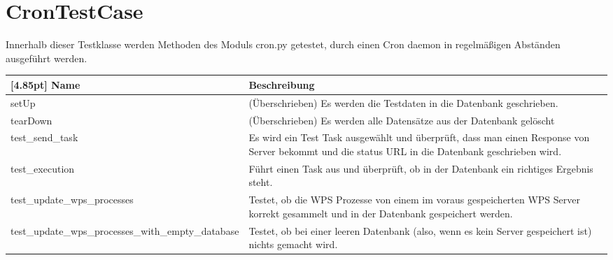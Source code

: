 	\section{CronTestCase}
	Innerhalb dieser Testklasse werden Methoden des Moduls cron.py getestet, durch einen Cron daemon in regelmäßigen Abständen ausgeführt werden.
	
	\begin{center}
		\renewcommand{\arraystretch}{1.5}
		\setlength\tabcolsep{5pt}
		\begin{tabularx}{\textwidth}{|l|X|}
			\hline
			\rowcolor[gray]{0.75}[4.85pt]
			Name & Beschreibung \\ \hline
			setUp & (Überschrieben) \newline Es werden die Testdaten in die Datenbank geschrieben. \\ \hline
			tearDown & (Überschrieben) \newline Es werden alle Datensätze aus der Datenbank gelöscht\\ \hline
			test\_send\_task & Es wird ein Test Task ausgewählt und überprüft, dass man einen Response von Server bekommt und die status URL in die Datenbank geschrieben wird. \\ \hline
			test\_execution & Führt einen Task aus und überprüft, ob in der Datenbank ein richtiges Ergebnis steht. \\ \hline
			test\_update\_wps\_processes & Testet, ob die WPS Prozesse von einem im voraus gespeicherten WPS Server korrekt gesammelt und in der Datenbank gespeichert werden.\\ \hline
			test\_update\_wps\_processes\_with\_empty\_database & Testet, ob bei einer leeren Datenbank (also, wenn es kein Server gespeichert ist) nichts gemacht wird. \\ \hline
			
		\end{tabularx}
	\end{center}
	
	
